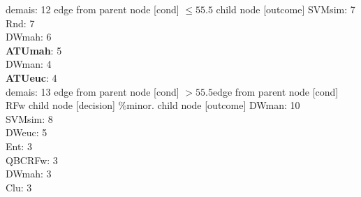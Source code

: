 {{{{%
demais: 12} edge from parent node [cond] {$\leq55.5$}}
child {node [outcome] {
SVMsim: 7\\
Rnd: 7\\
DWmah: 6\\
\textbf{ATUmah}: 5\\
DWman: 4\\
\textbf{ATUeuc}: 4\\
demais: 13} edge from parent node [cond] {$>55.5$}}edge from parent node [cond] {RFw}}
child {node [decision] {\%minor.}
child {node [outcome] {
DWman: 10\\
SVMsim: 8\\
DWeuc: 5\\
Ent: 3\\
QBCRFw: 3\\
DWmah: 3\\
Clu: 3\\
}}}}
